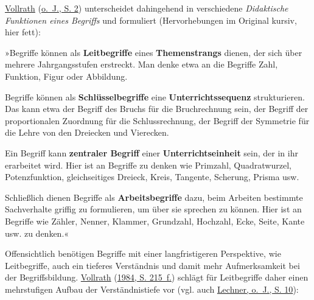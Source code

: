 \documentclass[
  ngerman,
]{scrbook}
\theoremstyle{definition}
\theoremstyle{definition}
\theoremstyle{definition}
\theoremstyle{definition}
\theoremstyle{remark}
\begin{document}
\protect\hyperlink{ref-Vollrath}{Vollrath} (\protect\hyperlink{ref-Vollrath}{o.~J., S. 2}) unterscheidet dahingehend in verschiedene \emph{Didaktische Funktionen eines Begriffs} und formuliert (Hervorhebungen im Original kursiv, hier fett):

»Begriffe können als \textbf{Leitbegriffe} eines \textbf{Themenstrangs} dienen, der sich über mehrere Jahrgangsstufen erstreckt. Man denke etwa an die Begriffe Zahl, Funktion, Figur oder Abbildung.

Begriffe können als \textbf{Schlüsselbegriffe} eine \textbf{Unterrichtssequenz} strukturieren. Das kann etwa der Begriff des Bruchs für die Bruchrechnung sein, der Begriff der proportionalen Zuordnung für die Schlussrechnung, der Begriff der Symmetrie für die Lehre von den Dreiecken und Vierecken.

Ein Begriff kann \textbf{zentraler Begriff} einer \textbf{Unterrichtseinheit} sein, der in ihr erarbeitet wird. Hier ist an Begriffe zu denken wie Primzahl, Quadratwurzel, Potenzfunktion, gleichseitiges Dreieck, Kreis, Tangente, Scherung, Prisma usw.

Schließlich dienen Begriffe als \textbf{Arbeitsbegriffe} dazu, beim Arbeiten bestimmte Sachverhalte griffig zu formulieren, um über sie sprechen zu können. Hier ist an Begriffe wie Zähler, Nenner, Klammer, Grundzahl, Hochzahl, Ecke, Seite, Kante usw. zu denken.«

Offensichtlich benötigen Begriffe mit einer langfristigeren Perspektive, wie Leitbegriffe, auch ein tieferes Verständnis und damit mehr Aufmerksamkeit bei der Begriffsbildung. \protect\hyperlink{ref-Vollrath1984}{Vollrath} (\protect\hyperlink{ref-Vollrath1984}{1984, S. 215~f.}) schlägt für Leitbegriffe daher einen mehrstufigen Aufbau der Verständnistiefe vor (vgl. auch \protect\hyperlink{ref-Lechner}{Lechner, o.~J., S. 10}):
\end{document}
